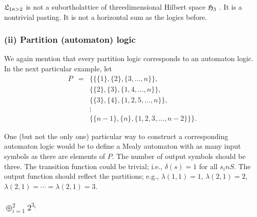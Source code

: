 ${\frak L}_{1n>2}$ is not a
subortholattice of threedimensional Hilbert space ${\frak H}_3$
\cite{svozil-tkadlec}.
It is a nontrivial pasting. It is not  a horizontal sum as the logics
before.

\subsubsection*{(ii) Partition (automaton) logic}
We again mention that every partition logic corresponds to an automaton
logic.
In the next particular example, let
\begin{eqnarray*}
P&=&\{
\{\{1\},\{ 2\} ,\{ 3,\ldots, n\}\},       \\
&&\{\{ 2 \},\{ 3\},\{1,4,\ldots ,n\}\},       \\
&&\{\{ 3 \},\{ 4\},\{1,2,5,\ldots ,n\}\},       \\
&&\vdots \\
&&\{\{n-1\},\{ n\},\{ 1,2,3,\ldots , n-2\}\}
\}.
\end{eqnarray*}

One (but not the only one) particular way to construct a corresponding
automaton
logic would be to define a Mealy automaton with as many input symbols as
there are elements of $P$. The number of output symbols should be
three. The transition function could be trivial; i.e., $\delta (s)=1$
for all $s_in S$. The output function should reflect the partitions;
e.g.,
$\lambda (1,1)=1$,
$\lambda (2,1)=2$,
$\lambda (2,1)=
\cdots =
\lambda (2,1)=3$.

\clearpage

\subsubsection{$\oplus_{i=1}^2 2^{3_i}$}
\label{n-tr}


